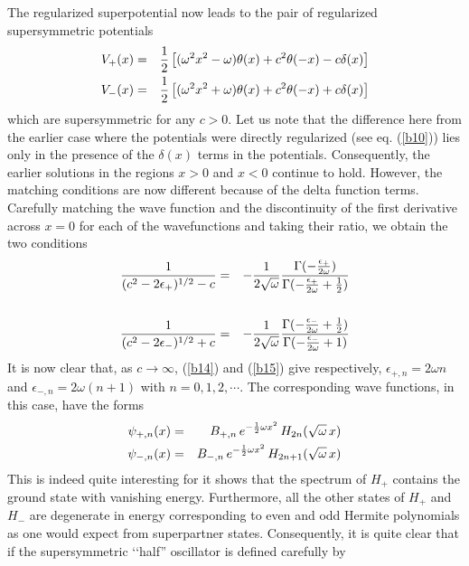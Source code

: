 \documentclass[a4paper,11pt]{article}
\begin{document}
The regularized superpotential now leads to the pair of regularized
supersymmetric potentials
\begin{eqnarray}
V_{+}(x) & = & {1\over 2}\left[(\omega^{2}x^{2}-\omega)\theta(x) +
c^{2}\theta(-x) - c\delta(x)\right]\nonumber\\
V_{-}(x) & = & {1\over 2}\left[(\omega^{2}x^{2}+\omega)\theta(x) +
c^{2}\theta(-x) + c\delta(x)\right]\label{b13}
\end{eqnarray}
which are supersymmetric for any $c>0$. Let us note that the
difference here from the earlier case where the potentials were
directly regularized (see eq. (\ref{b10})) lies only in the presence
of the $\delta(x)$ 
terms in the potentials. Consequently, the earlier solutions in the
regions $x>0$ and $x<0$ continue to hold. However, the matching
conditions are now different because of the delta function terms. 
Carefully matching the wave function and the discontinuity of the
first derivative across $x=0$ for each of the wavefunctions and taking
their ratio, we obtain the two conditions
\begin{eqnarray}
\frac{1}{(c^{2}-2\epsilon_{+})^{1/2} - c} & = & -{1\over
2\sqrt{\omega}}\frac{\Gamma(-{\epsilon_{+}\over
2\omega})}{\Gamma(-{\epsilon_{+}\over 2\omega}+{1\over
2})}\label{b14}\\
  &  & \nonumber\\
\frac{1}{(c^{2}-2\epsilon_{-})^{1/2} + c} & = & -{1\over
2\sqrt{\omega}}\frac{\Gamma(-{\epsilon_{-}\over
2\omega}+{1\over 2})}{\Gamma(-{\epsilon_{-}\over
2\omega}+1)}\label{b15}
\end{eqnarray}
It is now clear that, as $c\rightarrow\infty$, (\ref{b14}) and
(\ref{b15}) give respectively,
$\epsilon_{+,n} = 2\omega n$ and
$\epsilon_{-,n} = 2\omega(n+1)$ with $n=0,1,2,\cdots$.
The corresponding wave functions, in this case, have the forms
\begin{eqnarray}
\psi_{+,n}(x) & = & B_{+,n}\,e^{-{1\over 2}\omega
x^{2}}\,H_{2n}(\sqrt{\omega}\,x)\nonumber\\
\psi_{-,n}(x) & = & B_{-,n}\,e^{-{1\over 2}\omega
x^{2}}\,H_{2n+1}(\sqrt{\omega}\,x)\label{b17}
\end{eqnarray}
This is indeed quite interesting for it shows that the spectrum of
$H_{+}$ contains the ground state with vanishing energy. Furthermore,
all the other states of $H_{+}$ and $H_{-}$ are degenerate in energy
corresponding to even and odd Hermite polynomials as one would expect
from superpartner states. Consequently, it is quite clear that if the
supersymmetric \lq\lq half'' oscillator is defined carefully by
\end{document}
